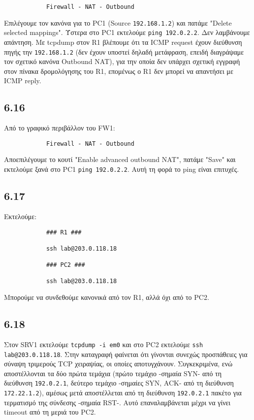 \documentclass[a4paper, 12pt]{article}
\begin{document}
		\begin{verbatim}
			Firewall - NAT - Outbound
		\end{verbatim}
		
		Επιλέγουμε τον κανόνα για το PC1 (Source \verb|192.168.1.2|) και πατάμε "Delete selected mappings". Ύστερα στο PC1 εκτελούμε \verb|ping 192.0.2.2|. Δεν λαμβάνουμε απάντηση. Με tcpdump στον R1 βλέπουμε ότι τα ICMP request έχουν διεύθυνση πηγής την \verb|192.168.1.2| (δεν έχουν υποστεί δηλαδή μετάφραση, επειδή διαγράψαμε τον σχετικό κανόνα Outbound NAT), για την οποία δεν υπάρχει σχετική εγγραφή στον πίνακα δρομολόγησης του R1, επομένως ο R1 δεν μπορεί να απαντήσει με ICMP reply.

	\subsection*{6.16}
		Από το γραφικό περιβάλλον του FW1:
		
		\begin{verbatim}
			Firewall - NAT - Outbound
		\end{verbatim}
		
		Αποεπιλέγουμε το κουτί "Enable advanced outbound NAT", πατάμε "Save" και εκτελούμε ξανά στο PC1 \verb|ping 192.0.2.2|. Αυτή τη φορά το ping είναι επιτυχές.

	\subsection*{6.17}
		Εκτελούμε:
		
		\begin{verbatim}
			### R1 ###
			
			ssh lab@203.0.118.18
			
			### PC2 ###
			
			ssh lab@203.0.118.18
		\end{verbatim}
		
		Μπορούμε να συνδεθούμε κανονικά από τον R1, αλλά όχι από το PC2.

	\subsection*{6.18}
		Στον SRV1 εκτελούμε \verb|tcpdump -i em0| και στο PC2 εκτελούμε \verb|ssh lab@203.0.118.18|. Στην καταγραφή φαίνεται ότι γίνονται συνεχώς προσπάθειες για σύναψη τριμερούς TCP χειραψίας, οι οποίες αποτυγχάνουν. Συγκεκριμένα, ενώ αποστέλλονται τα δύο πρώτα τεμάχια (πρώτο τεμάχιο -σημαία SYN- από τη διεύθυνση \verb|192.0.2.1|, δεύτερο τεμάχιο -σημαίες SYN, ACK- από τη διεύθυνση \verb|172.22.1.2|), αμέσως μετά αποστέλλεται από τη διεύθυνση \verb|192.0.2.1| πακέτο για τερματισμό της σύνδεσης -σημαία RST-. Αυτό επαναλαμβάνεται μέχρι να γίνει timeout από τη μεριά του PC2.
\end{document}
